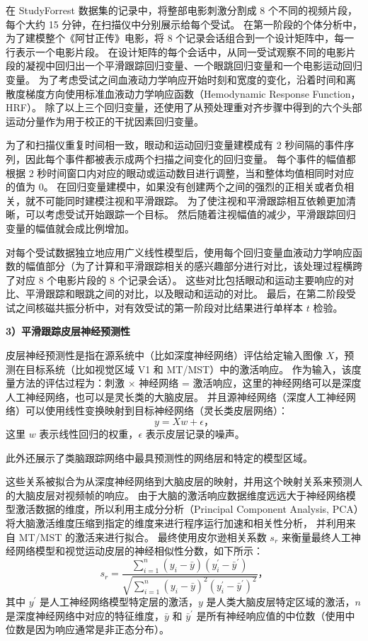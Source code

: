\documentclass[a4paper,zihao=-4]{article}
\begin{document}
在 StudyForrest 数据集的记录中，将整部电影刺激分割成 8 个不同的视频片段，每个大约 15 分钟，在扫描仪中分别展示给每个受试。
在第一阶段的个体分析中，
为了建模整个《阿甘正传》电影，将 8 个记录会话组合到一个设计矩阵中，每一行表示一个电影片段。
在设计矩阵的每个会话中，从同一受试观察不同的电影片段的凝视中回归出一个平滑跟踪回归变量、一个眼跳回归变量和一个电影运动回归变量。
为了考虑受试之间血液动力学响应开始时刻和宽度的变化，沿着时间和离散度梯度方向使用标准血液动力学响应函数（Hemodynamic Response Function，HRF）。
除了以上三个回归变量，还使用了从预处理重对齐步骤中得到的六个头部运动分量作为用于校正的干扰因素回归变量。

为了和扫描仪重复时间相一致，眼动和运动回归变量建模成有 2 秒间隔的事件序列，因此每个事件都被表示成两个扫描之间变化的回归变量。
每个事件的幅值都根据 2 秒时间窗口内对应的眼动或运动数目进行调整，当和整体均值相同时对应的值为 0。
在回归变量建模中，如果没有创建两个之间的强烈的正相关或者负相关，就不可能同时建模注视和平滑跟踪。
为了使注视和平滑跟踪相互依赖更加清晰，可以考虑受试开始跟踪一个目标。
然后随着注视幅值的减少，平滑跟踪回归变量的幅值就会成比例增加。

对每个受试数据独立地应用广义线性模型后，使用每个回归变量血液动力学响应函数的幅值部分（为了计算和平滑跟踪相关的感兴趣部分进行对比，该处理过程横跨了对应 8 个电影片段的 8 个记录会话）。
这些对比包括眼动和运动主要响应的对比、平滑跟踪和眼跳之间的对比，以及眼动和运动的对比。
最后，在第二阶段受试之间核磁共振分析中，对有效受试的第一阶段对比结果进行单样本 $t$ 检验。


\textbf{3）平滑跟踪皮层神经预测性}

皮层神经预测性是指在源系统中（比如深度神经网络）评估给定输入图像 $X$，预测在目标系统（比如视觉区域 V1 和 MT/MST）中的激活响应。
作为输入，该度量方法的评估过程为：刺激 $\times$ 神经网络 = 激活响应，这里的神经网络可以是深度人工神经网络，也可以是灵长类的大脑皮层。
并且源神经网络（深度人工神经网络）可以使用线性变换映射到目标神经网络（灵长类皮层网络）：
\begin{equation}
	y = Xw + \epsilon \mbox{，}
\end{equation}
这里 $w$ 表示线性回归的权重，$\epsilon$ 表示皮层记录的噪声。

此外还展示了类脑跟踪网络中最具预测性的网络层和特定的模型区域。

这些关系被拟合为从深度神经网络到大脑皮层的映射，并用这个映射关系来预测人的大脑皮层对视频帧的响应。
由于大脑的激活响应数据维度远远大于神经网络模型激活数据的维度，所以利用主成分分析（Principal Component Analysis, PCA）将大脑激活维度压缩到指定的维度来进行程序运行加速和相关性分析，
并利用来自 MT/MST 的激活来进行拟合。 
最终使用皮尔逊相关系数 $s_r$ 来衡量最终人工神经网络模型和视觉运动皮层的神经相似性分数，如下所示：
\begin{equation}
	s_r=\frac{\sum_{i=1}^{n} (y_i-\bar{y}) (y_i^\prime - \bar{y}^\prime) }{\sqrt{\sum_{i=1}^{n} (y_i - \bar{y})^2 (y_i^\prime - \bar{y}^\prime)^2 }}\mbox{，}
\end{equation}
其中 $y^\prime$ 是人工神经网络模型特定层的激活，$y$ 是人类大脑皮层特定区域的激活，$n$ 是深度神经网络中对应的特征维度，$\bar{y}$ 和 $\bar{y}^\prime$ 是所有神经响应值的中位数（使用中位数是因为响应通常是非正态分布）。
\end{document}
